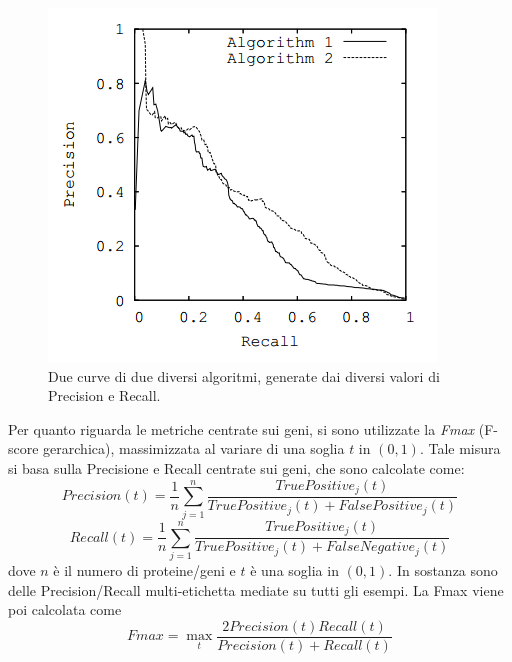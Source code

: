 \documentclass[12pt]{report}
\begin{document}
\begin{figure}[h]
\center
\includegraphics[scale=0.7]{./images/Prccurves.png}
\caption{\footnotesize{Due curve di due diversi algoritmi, generate dai diversi valori di Precision e Recall.}}
\label{prc_plot_ex}
\end{figure}

Per quanto riguarda le metriche centrate sui geni, si sono utilizzate la \emph{Fmax} (F-score gerarchica), massimizzata al variare di una soglia $t$ in $(0, 1)$. Tale misura si basa sulla Precisione e Recall centrate sui geni, che sono calcolate come:
\[
Precision(t) = \frac{1}{n}\sum_{j=1}^{n}\frac{TruePositive_{j}(t)}{TruePositive_{j}(t)+FalsePositive_j(t)}
\]
\[
Recall(t) = \frac{1}{n}\sum_{j=1}^{n} \frac{TruePositive_j(t)}{TruePositive_j(t)+FalseNegative_j(t)}
\]
dove $n$ è il numero di proteine/geni e $t$ è una soglia in $(0, 1)$. In sostanza sono delle Precision/Recall multi-etichetta mediate su tutti gli esempi. La Fmax viene poi calcolata come
\[
Fmax = \max_t\frac{2Precision(t)Recall(t)}{Precision(t)+Recall(t)}
\]
\end{document}
